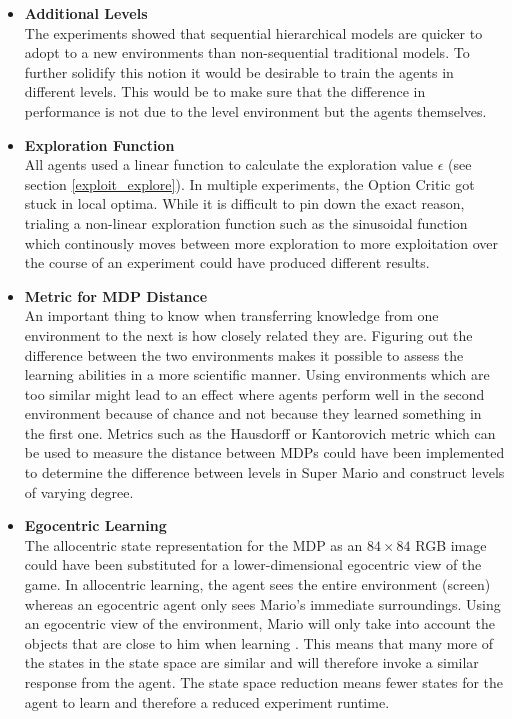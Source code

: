 \documentclass[notitlepage,a4paper,11pt]{article}
\begin{document}
\begin{itemize}
	
	\item
	\textbf{Additional Levels}\\
	The experiments showed that sequential hierarchical models are quicker to adopt to a new environments than non-sequential traditional models. To further solidify this notion it would be desirable to train the agents in different levels. This would be to make sure that the difference in performance is not due to the level environment but the agents themselves.
	
	\item	
	\textbf{Exploration Function}\\
	All agents used a linear function to calculate the exploration value $\epsilon$ (see section \ref{exploit_explore}). In multiple experiments, the Option Critic got stuck in local optima. While it is difficult to pin down the exact reason, trialing a non-linear exploration function such as the sinusoidal function \cite{chuchro2017game} which continously moves between more exploration to more exploitation over the course of an experiment could have produced different results. 
	
	\item
	\textbf{Metric for MDP Distance}\\
	An important thing to know when transferring knowledge from one environment to the next is how closely related they are. Figuring out the difference between the two environments makes it possible to assess the learning abilities in a more scientific manner. Using environments which are too similar might lead to an effect where agents perform well in the second environment because of chance and not because they learned something in the first one. Metrics such as the Hausdorff or Kantorovich metric which can be used to measure the distance between MDPs \cite{song2016measuring} could have been implemented to determine the difference between levels in Super Mario and construct levels of varying degree.
	
	\item
	\textbf{Egocentric Learning} \\
	The allocentric state representation for the MDP as an $84 \times 84$ RGB image could have been substituted for a lower-dimensional egocentric view of the game. In allocentric learning, the agent sees the entire environment (screen) whereas an egocentric agent only sees Mario's immediate surroundings. Using an egocentric view of the environment, Mario will only take into account the objects that are close to him when learning \cite{byrne2008principle}. This means that many more of the states in the state space are similar and will therefore invoke a similar response from the agent. The state space reduction means fewer states for the agent to learn and therefore a reduced experiment runtime.
	

\end{itemize}
\end{document}
